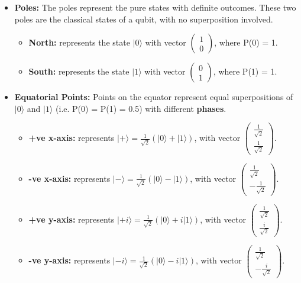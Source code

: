 \begin{itemize}[noitemsep]
    \item \textbf{Poles:} The poles represent the pure states with definite outcomes. These two poles are the classical states of a qubit, with no superposition involved.
    \begin{itemize}
        \item \textbf{North:} represents the state \( |0\rangle \) with vector \( \begin{pmatrix} 1 \\ 0 \end{pmatrix} \), where P(0) = 1.
        \item \textbf{South:} represents the state \( |1\rangle \) with vector \( \begin{pmatrix} 0 \\ 1 \end{pmatrix} \), where P(1) = 1.
    \end{itemize}

    \item \textbf{Equatorial Points:} Points on the equator represent equal superpositions of \( |0\rangle \) and \( |1\rangle \) (i.e. P(0) = P(1) = 0.5) with different \textbf{phases}. 
    \begin{itemize}[label=$\circ$]
        \item \textbf{+ve x-axis:} represents \( |+\rangle = \frac{1}{\sqrt{2}}(|0\rangle + |1\rangle) \), with vector \( \begin{pmatrix} \frac{1}{\sqrt{2}} \\ \frac{1}{\sqrt{2}} \end{pmatrix} \).
        
        \item \textbf{-ve x-axis:} represents \( |-\rangle = \frac{1}{\sqrt{2}}(|0\rangle - |1\rangle) \), with vector \( \begin{pmatrix} \frac{1}{\sqrt{2}} \\ -\frac{1}{\sqrt{2}} \end{pmatrix} \). 
        
        \item \textbf{+ve y-axis:} represents \( |+i\rangle = \frac{1}{\sqrt{2}}(|0\rangle + i|1\rangle) \), with vector \( \begin{pmatrix} \frac{1}{\sqrt{2}} \\ \frac{i}{\sqrt{2}} \end{pmatrix} \). 
        
        \item \textbf{-ve y-axis:} represents \( |-i\rangle = \frac{1}{\sqrt{2}}(|0\rangle - i|1\rangle) \), with vector \( \begin{pmatrix} \frac{1}{\sqrt{2}} \\ -\frac{i}{\sqrt{2}} \end{pmatrix} \). 
    \end{itemize}
\end{itemize}

